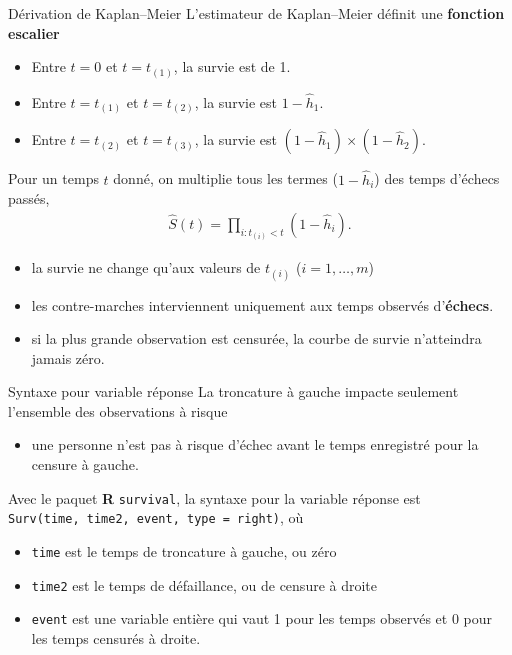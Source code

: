 \documentclass[
  ignorenonframetext,
]{beamer}
\providecommand{\tightlist}{%
  \setlength{\itemsep}{0pt}\setlength{\parskip}{0pt}}
\begin{document}
\begin{frame}{Dérivation de Kaplan--Meier}
\protect{}\label{duxe9rivation-de-kaplanmeier}
L'estimateur de Kaplan--Meier définit une \textbf{fonction escalier}
\footnotesize

\begin{itemize}
\tightlist
\item
  Entre \(t=0\) et \(t=t_{(1)}\), la survie est de 1.
\item
  Entre \(t=t_{(1)}\) et \(t=t_{(2)}\), la survie est
  \(1-\widehat{h}_1\).
\item
  Entre \(t=t_{(2)}\) et \(t=t_{(3)}\), la survie est
  \((1-\widehat{h}_1) \times (1-\widehat{h}_2)\).
\end{itemize}

\normalsize

Pour un temps \(t\) donné, on multiplie tous les termes
(\(1-\widehat{h}_i\)) des temps d'échecs passés, \begin{align*}
 \widehat{S}(t) = \prod_{i: t_{(i)} < t} \left( 1- \widehat{h}_i\right).
\end{align*}

\begin{itemize}
\tightlist
\item
  la survie ne change qu'aux valeurs de \(t_{(i)}\) (\(i=1, \ldots, m\))
\item
  les contre-marches interviennent uniquement aux temps observés
  d'\textbf{échecs}.
\item
  si la plus grande observation est censurée, la courbe de survie
  n'atteindra jamais zéro.
\end{itemize}
\end{frame}

\begin{frame}[fragile]{Syntaxe pour variable réponse}
\protect{}\label{syntaxe-pour-variable-ruxe9ponse}
La troncature à gauche impacte seulement l'ensemble des observations à
risque

\begin{itemize}
\tightlist
\item
  une personne n'est pas à risque d'échec avant le temps enregistré pour
  la censure à gauche.
\end{itemize}

Avec le paquet \textbf{R} \texttt{survival}, la syntaxe pour la variable
réponse est
\texttt{Surv(time,\ time2,\ event,\ type\ =\ \textquotesingle{}right\textquotesingle{})},
où

\begin{itemize}
\tightlist
\item
  \texttt{time} est le temps de troncature à gauche, ou zéro
\item
  \texttt{time2} est le temps de défaillance, ou de censure à droite
\item
  \texttt{event} est une variable entière qui vaut 1 pour les temps
  observés et 0 pour les temps censurés à droite.
\end{itemize}
\end{frame}
\end{document}
